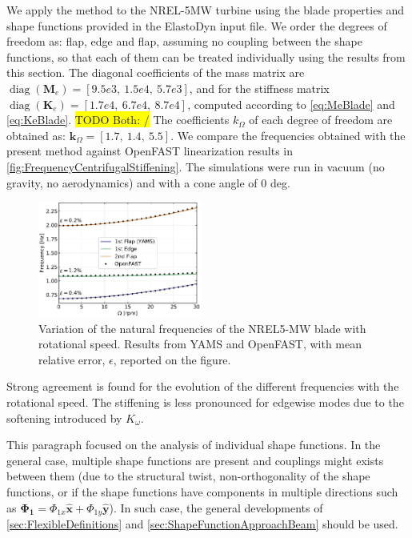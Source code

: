 \documentclass[wes, manuscript]{copernicus}
\renewcommand{\v}[1]{\boldsymbol{#1}}
\newcommand{\m}[1]{\boldsymbol{#1}}
\newcommand{\todoBoth}    [1]{{\colorbox{yellow}{TODO Both:    }}{\color{red}{#1}}\colorbox{yellow}{/}}
\begin{document}
We apply the method to the NREL-5MW turbine using the blade properties and shape functions provided in the ElastoDyn input file. 
We order the degrees of freedom as:  flap,  edge and  flap, assuming no coupling between the shape functions, so that each of them can be treated individually using the results from this section.
The diagonal coefficients of the mass matrix are $\operatorname{diag}(\m{M}_e) = [9.5e3,\ 1.5e4,\ 5.7e3]$, and for the stiffness matrix
$\operatorname{diag}(\m{K}_e)=[1.7e4,\ 6.7e4,\ 8.7e4]$, computed according to \autoref{eq:MeBlade} and \autoref{eq:KeBlade}.
\todoBoth{should be "equation" not "Equation"}
The coefficients $k_\Omega$ of each degree of freedom are obtained as: $\v{k}_\Omega =[1.7,\ 1.4,\ 5.5]$. We compare the frequencies obtained with the present method against OpenFAST linearization results in \autoref{fig:FrequencyCentrifugalStiffening}.
The simulations were run in vacuum (no gravity, no aerodynamics) and with a cone angle of 0 deg.
\noindent\begin{figure}[!htb]\centering%
  \includegraphics[width=0.48\textwidth]{figs/FrequencyCentrifugalStiffening.pdf}
  \caption{Variation of the natural frequencies of the NREL5-MW blade with rotational speed. Results from YAMS and OpenFAST, with mean relative error, $\epsilon$, reported on the figure.}\label{fig:FrequencyCentrifugalStiffening}%
\end{figure}
Strong agreement is found for the evolution of the different frequencies with the rotational speed.
The stiffening is less pronounced for edgewise modes due to the softening introduced by $K_\omega$.

This paragraph focused on the analysis of individual shape functions.
In the general case, multiple shape functions are present and couplings might exists between them (due to the structural twist, non-orthogonality of the shape functions, or if the shape functions have components in multiple directions such as $\v{\Phi_1}=\Phi_{1x}\v{\hat{x}}+\Phi_{1y}\v{\hat{y}}$).
In such case, the general developments of 
\autoref{sec:FlexibleDefinitions} and 
\autoref{sec:ShapeFunctionApproachBeam} should be used.
\end{document}
